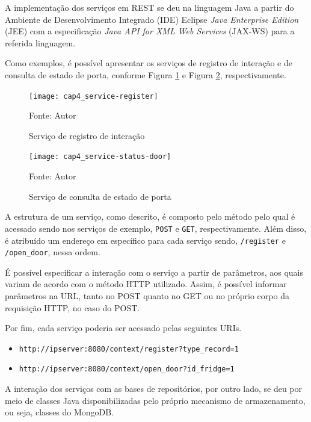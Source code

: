 A implementação dos serviços em REST se deu na linguagem Java a partir do Ambiente de Desenvolvimento Integrado (IDE) Eclipse \textit{Java Enterprise Edition} (JEE) com a especificação \textit{Java API for XML Web Services} (JAX-WS) para a referida linguagem.

Como exemplos, é possível apresentar os serviços de registro de interação e de consulta de estado de porta, conforme Figura \ref{fig:cap4_service-register} e Figura \ref{fig:cap4_service-status-door}, respectivamente.

\begin{figure}[htb]
    \caption{Serviço de registro de interação}
    \label{fig:cap4_service-register}
    \texttt{[image: cap4\_service-register]}
    
    \footnotesize{Fonte: Autor}
\end{figure}


\begin{figure}[htb]
    \caption{Serviço de consulta de estado de porta}
    \label{fig:cap4_service-status-door}
    \texttt{[image: cap4\_service-status-door]}
    
    \footnotesize{Fonte: Autor}
\end{figure}

A estrutura de um serviço, como descrito, é composto pelo método pelo qual é acessado sendo nos serviços de exemplo, \texttt{POST} e \texttt{GET}, respectivamente. Além disso, é atribuído um endereço em específico para cada serviço sendo, \texttt{/register} e \texttt{/open\_door}, nessa ordem. 

É possível especificar a interação com o serviço a partir de parâmetros, aos quais variam de acordo com o método HTTP utilizado. Assim, é possível informar parâmetros na URL, tanto no POST quanto no GET ou no próprio corpo da requisição HTTP, no caso do POST.

Por fim, cada serviço poderia ser acessado pelas seguintes URIs.

\begin{itemize} \parskip -4pt
    \item \texttt{http://ipserver:8080/context/register?type\_record=1}
    \item \texttt{http://ipserver:8080/context/open\_door?id\_fridge=1}
\end{itemize}

A interação dos serviços com as bases de repositórios, por outro lado, se deu por meio de classes Java disponibilizadas pelo próprio mecanismo de armazenamento, ou seja, classes do MongoDB.

